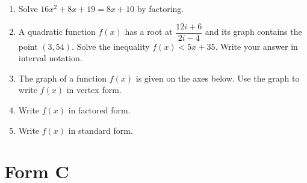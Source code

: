\begin{enumerate}[leftmargin=*, label=\textbf{\arabic*.}, resume]
  \item Solve $16x^2 + 8x + 19 = 8x + 10$ by factoring. 
  \vgappp

  \item A quadratic function $f(x)$ has a root at $\dfrac{12i+6}{2i-4}$ and its graph contains the point $(3,54)$. Solve the inequality $f(x) < 5x + 35$. Write your answer in interval notation. 
  \vgappp

  \item The graph of a function $f(x)$ is given on the axes below. Use the graph to write $f(x)$ in vertex form. 

  \begin{center}
  \end{center}
  \vgap

  \item Write $f(x)$ in factored form. 
  \vgap

  \item Write $f(x)$ in standard form. 
  \vgapp

\end{enumerate}

\clearpage
\section*{Form C}

